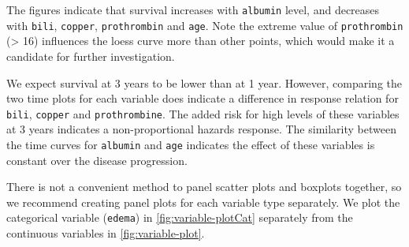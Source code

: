 \documentclass[article, nojss]{jss}
\begin{document}
The figures indicate that survival increases with \texttt{albumin}
level, and decreases with \texttt{bili}, \texttt{copper},
\texttt{prothrombin} and \texttt{age}. Note the extreme value of
\texttt{prothrombin} (\textgreater{} 16) influences the loess curve more
than other points, which would make it a candidate for further
investigation.

We expect survival at 3 years to be lower than at 1 year. However,
comparing the two time plots for each variable does indicate a
difference in response relation for \texttt{bili}, \texttt{copper} and
\texttt{prothrombine}. The added risk for high levels of these variables
at 3 years indicates a non-proportional hazards response. The similarity
between the time curves for \texttt{albumin} and \texttt{age} indicates
the effect of these variables is constant over the disease progression.

There is not a convenient method to panel scatter plots and boxplots
together, so we recommend creating panel plots for each variable type
separately. We plot the categorical variable (\texttt{edema}) in
\autoref{fig:variable-plotCat} separately from the continuous variables
in \autoref{fig:variable-plot}.
\end{document}
